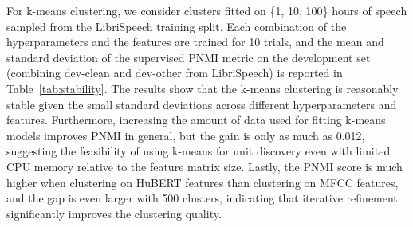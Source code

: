 For k-means clustering, we consider  clusters fitted on \{1, 10, 100\} hours of speech sampled from the LibriSpeech training split. Each combination of the hyperparameters and the features are trained for 10 trials, and the mean and standard deviation of the supervised PNMI metric on the development set (combining dev-clean and dev-other from LibriSpeech) is reported in Table~\ref{tab:stability}.
The results show that the k-means clustering is reasonably stable given the small standard deviations across different hyperparameters and features. Furthermore, increasing the amount of data used for fitting k-means models improves PNMI in general, but the gain is only as much as 0.012, suggesting the feasibility of using k-means for unit discovery even with limited CPU memory relative to the feature matrix size. Lastly, the PNMI score is much higher when clustering on HuBERT features than clustering on MFCC features, and the gap is even larger with 500 clusters, indicating that iterative refinement significantly improves the clustering quality.


